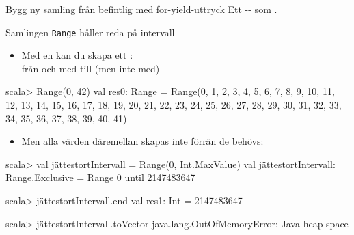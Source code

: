 \begin{Slide}{Bygg ny samling från befintlig med for-yield-uttryck}
Ett -- som .



\end{Slide}


\begin{Slide}{Samlingen {\tt Range} håller reda på intervall}
\begin{itemize}
\item Med en  kan du skapa ett : \\ från och med  till (men inte med) 
\end{itemize}

\begin{REPLnonum}
scala> Range(0, 42)
val res0: Range =
  Range(0, 1, 2, 3, 4, 5, 6, 7, 8, 9, 10, 11, 12, 13, 14,
    15, 16, 17, 18, 19, 20, 21, 22, 23, 24, 25, 26, 27, 28,
    29, 30, 31, 32, 33, 34, 35, 36, 37, 38, 39, 40, 41)
\end{REPLnonum}

\begin{itemize}
\item Men alla värden däremellan skapas inte förrän de behövs:
\end{itemize}

\begin{REPL}
scala> val jättestortIntervall = Range(0, Int.MaxValue)
val jättestortIntervall: Range.Exclusive = Range 0 until 2147483647

scala> jättestortIntervall.end
val res1: Int = 2147483647

scala> jättestortIntervall.toVector
java.lang.OutOfMemoryError: Java heap space
\end{REPL}

\end{Slide}

